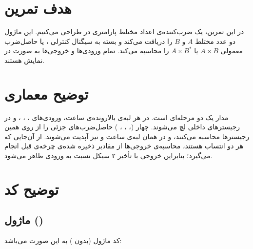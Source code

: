 \section{هدف تمرین}
در این تمرین، یک ضرب‌کننده‌ی اعداد مختلط پارامتری در  طراحی می‌کنیم. این ماژول دو عدد مختلط $A$ و $B$ را دریافت می‌کند و بسته به سیگنال کنترلی ، یا حاصل‌ضرب معمولی $A \times B$ یا $A \times B^*$ را محاسبه می‌کند. تمام ورودی‌ها و خروجی‌ها به صورت  در نمایش  هستند.

\section{توضیح معماری}
مدار یک  دو مرحله‌ای  است. در هر لبه‌ی بالارونده‌ی ساعت، ورودی‌های ، ، ،  و  در رجیسترهای داخلی لچ می‌شوند. چهار   (، ، ، ) حاصل‌ضرب‌های جزئی را از روی همین رجیسترها محاسبه می‌کنند، و در همان لبه‌ی ساعت  و  نیز آپدیت می‌شوند. از آن‌جایی که هر دو انتساب  هستند، محاسبه‌ی خروجی‌ها از مقادیر ذخیره شده‌ی چرخه‌ی قبل انجام می‌گیرد؛ بنابراین خروجی با تأخیر ۲ سیکل نسبت به ورودی ظاهر می‌شود.

\section{توضیح کد}

\subsection{ماژول  ()}
کد ماژول (بدون ) به این صورت می‌باشد:

